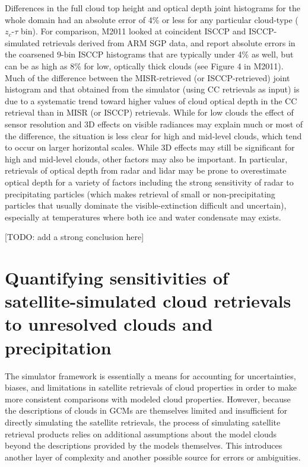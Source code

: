 Differences in the full cloud top height and optical depth joint
histograms for the whole domain had an absolute error of 4\% or less for
any particular cloud-type (\(z_c\)-\(\tau\) bin). For comparison, M2011
looked at coincident ISCCP and ISCCP-simulated retrievals derived from
ARM SGP data, and report absolute errors in the coarsened 9-bin ISCCP
histograms that are typically under 4\% as well, but can be as high as
8\% for low, optically thick clouds (see Figure 4 in M2011). Much of the
difference between the MISR-retrieved (or ISCCP-retrieved) joint
histogram and that obtained from the simulator (using CC retrievals as
input) is due to a systematic trend toward higher values of cloud
optical depth in the CC retrieval than in MISR (or ISCCP) retrievals.
While for low clouds the effect of sensor resolution and 3D effects on
visible radiances may explain much or most of the difference, the
situation is less clear for high and mid-level clouds, which tend to
occur on larger horizontal scales. While 3D effects may still be
significant for high and mid-level clouds, other factors may also be
important. In particular, retrievals of optical depth from radar and
lidar may be prone to overestimate optical depth for a variety of
factors including the strong sensitivity of radar to precipitating
particles (which makes retrieval of small or non-precipitating particles
that usually dominate the visible-extinction difficult and uncertain),
especially at temperatures where both ice and water condensate may
exists.

{[}TODO: add a strong conclusion here{]}

\chapter{Quantifying sensitivities of satellite-simulated cloud
retrievals to unresolved clouds and precipitation}\label{sec:subgrid1}

The simulator framework is essentially a means for accounting for
uncertainties, biases, and limitations in satellite retrievals of cloud
properties in order to make more consistent comparisons with modeled
cloud properties. However, because the descriptions of clouds in GCMs
are themselves limited and insufficient for directly simulating the
satellite retrievals, the process of simulating satellite retrieval
products relies on additional assumptions about the model clouds beyond
the descriptions provided by the models themselves. This introduces
another layer of complexity and another possible source for errors or
ambiguities.

